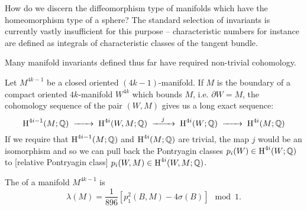 How do we discern the diffeomorphism type of manifolds which have the homeomorphism type of a sphere? The standard selection of invariants is currently vastly insufficient for this purpose -- characteristic numbers for instance are defined as integrals of characteristic classes of the tangent bundle.


Many manifold invariants defined thus far have required non-trivial cohomology. 

Let $M^{4k-1}$ be a closed oriented $(4k-1)$-manifold. If $M$ is the boundary of a compact oriented $4k$-manifold $W^{4k}$ which bounds $M$, i.e. $\partial W = M$, the cohomology sequence of the pair $(W,M)$ gives us a long exact sequence:
\[
  \H^{4i-1}(M;\Q) \lkxto \H^{4i}(W, M; \Q) \lkxto[j] \H^{4i}(W; \Q) \lkxto \H^{4i}(M; \Q)
\]
If we require that $\operatorname{H}^{4i-1}(M;\mathbb{Q})$ and $\operatorname{H}^{4i}(M;\mathbb{Q})$ are trivial, the map $j$ would be an isomorphism and so we can pull back the Pontryagin classes $p_i(W)\in \operatorname{H}^{4i}(W;\mathbb{Q})$ to [relative Pontryagin class] $p_i(W, M)\in\operatorname{H}^{4i}(W, M; \mathbb{Q})$.

\begin{definition}
	The  of a manifold $M^{4k-1}$ is
	\[
    \lambda(M) = \frac{1}{896}\left[p_1^2(B, M) - 4\sigma(B)\right] \mod 1.
	\]
\end{definition}
